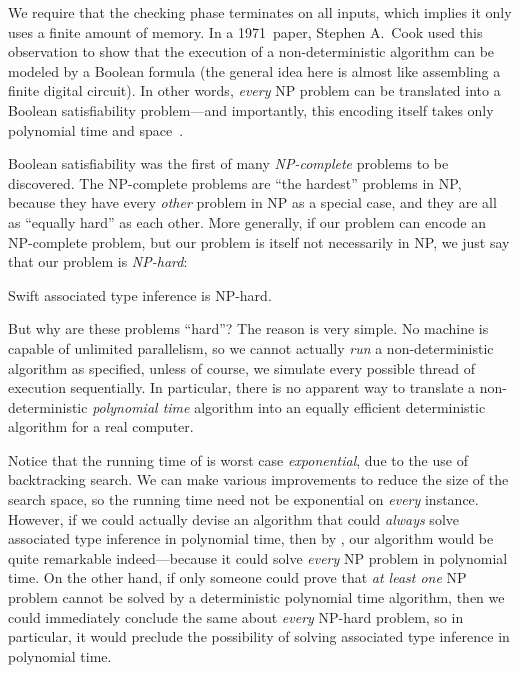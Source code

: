 \documentclass[../generics]{subfiles}
\begin{document}
We require that the checking phase terminates on all inputs, which implies it only uses a finite amount of memory. In a 1971~paper, Stephen A.~Cook used this observation to show that the execution of a non-deterministic algorithm can be modeled by a Boolean formula (the general idea here is almost like assembling a finite digital circuit). In other words, \emph{every} NP problem can be translated into a Boolean satisfiability problem---and importantly, this encoding itself takes only polynomial time and space~\cite{cook}.

Boolean satisfiability was the first of many \emph{NP-complete} problems to be discovered. The NP-complete problems are ``the hardest'' problems in NP, because they have every \emph{other} problem in NP as a special case, and they are all as ``equally hard'' as each other. More generally, if our problem can encode an NP-complete problem, but our problem is itself not necessarily in NP, we just say that our problem is \emph{NP-hard}:

\begin{theorem}\label{assoc np hard}
Swift associated type inference is NP-hard.
\end{theorem}

But why are these problems ``hard''? The reason is very simple. No machine is capable of unlimited parallelism, so we cannot actually \emph{run} a non-deterministic algorithm as specified, unless of course, we simulate every possible thread of execution sequentially. In particular, there is no apparent way to translate a non-deterministic \emph{polynomial time} algorithm into an equally efficient deterministic algorithm for a real computer.

Notice that the running time of  is worst case \emph{exponential}, due to the use of backtracking search. We can make various improvements to reduce the size of the search space, so the running time need not be exponential on \emph{every} instance. However, if we could actually devise an algorithm that could \emph{always} solve associated type inference in polynomial time, then by , our algorithm would be quite remarkable indeed---because it could solve \emph{every} NP problem in polynomial time. On the other hand, if only someone could prove that \emph{at least one} NP problem cannot be solved by a deterministic polynomial time algorithm, then we could immediately conclude the same about \emph{every} NP-hard problem, so in particular, it would preclude the possibility of solving associated type inference in polynomial time.
\end{document}
